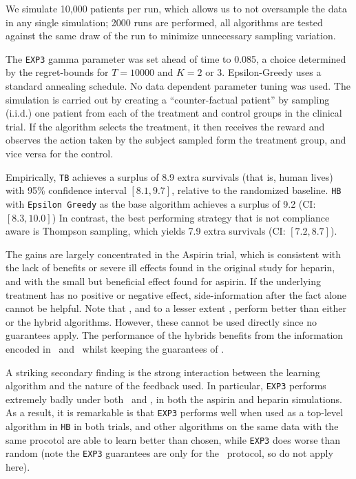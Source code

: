 We simulate 10,000 patients per run, which allows us to not oversample the data in any single simulation; 2000 runs are performed, all algorithms are tested against the same draw of the run to minimize unnecessary sampling variation. 

The \texttt{EXP3} gamma parameter was set ahead of time to 0.085, a choice determined by the regret-bounds for $T=10000$ and $K=2$ or $3$. Epsilon-Greedy uses a standard annealing schedule. No data dependent parameter tuning was used.
The simulation is carried out by creating a ``counter-factual patient'' by sampling (i.i.d.) one patient from each of the treatment and control groups in the clinical trial. If the algorithm selects the treatment, it then receives the reward and observes the action taken by the subject sampled form the treatment group, and vice versa for the control.


Empirically, \texttt{TB} achieves a surplus of 8.9 extra survivals (that is, human lives) with 95\% confidence interval $[8.1,9.7]$, relative to the randomized baseline.
\texttt{HB} with \texttt{Epsilon Greedy} as the base algorithm achieves a surplus of 9.2 (CI: $[8.3,10.0]$)
In contrast, the best performing strategy that is not compliance aware is Thompson sampling, which yields 7.9 extra survivals (CI: $[7.2,8.7]$). 

The gains are largely concentrated in the Aspirin trial, which is consistent with the lack of benefits or severe ill effects found in the original study \cite{ist:97} for heparin, and with the small but beneficial effect found for aspirin. 
If the underlying treatment has no positive or negative effect, side-information after the fact alone cannot be helpful.
Note that \actual, and to a lesser extent \comply, perform better than either \chosen\, or the hybrid algorithms. However, these cannot be used directly since no guarantees apply. The performance of the hybrids benefits from the information encoded in \actual\, and \comply\, whilst keeping the guarantees of \chosen. 


A striking secondary finding is the strong interaction between the learning algorithm and the nature of the feedback used. In particular, \texttt{EXP3} performs extremely badly under both \actual\, and \comply, in both the aspirin and heparin simulations. As a result, it is remarkable is that \texttt{EXP3} performs well when used as a top-level algorithm in \texttt{HB} in both trials, and other algorithms on the same data with the same procotol are able to learn better than chosen, while \texttt{EXP3} does worse than random (note the \texttt{EXP3} guarantees are only for the \chosen\, protocol, so do not apply here).



